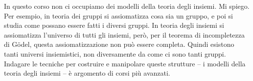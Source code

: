 In questo corso non ci occupiamo dei modelli della teoria degli insiemi. Mi spiego. Per esempio, in teoria dei gruppi si assiomatizza cosa sia un gruppo, e poi si studia come possano essere fatti i diversi gruppi. In 
teoria degli insiemi si assiomatizza l'universo di tutti gli insiemi, per\`o, per il teorema di incompletezza di G\"odel, questa assiomatizzazione non 
pu\`o essere completa. Quindi esistono tanti universi insiemistici,
non diversamente da come ci sono tanti gruppi.
Indagare le tecniche per costruire e manipolare queste strutture -- i modelli della teoria degli insiemi -- \`e argomento di corsi pi\`u avanzati.
